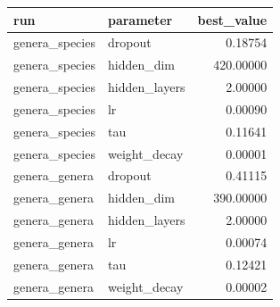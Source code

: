 \begin{tabular}{llr}
\toprule
run & parameter & best_value \\
\midrule
genera_species & dropout & 0.18754 \\
genera_species & hidden_dim & 420.00000 \\
genera_species & hidden_layers & 2.00000 \\
genera_species & lr & 0.00090 \\
genera_species & tau & 0.11641 \\
genera_species & weight_decay & 0.00001 \\
genera_genera & dropout & 0.41115 \\
genera_genera & hidden_dim & 390.00000 \\
genera_genera & hidden_layers & 2.00000 \\
genera_genera & lr & 0.00074 \\
genera_genera & tau & 0.12421 \\
genera_genera & weight_decay & 0.00002 \\
\bottomrule
\end{tabular}
